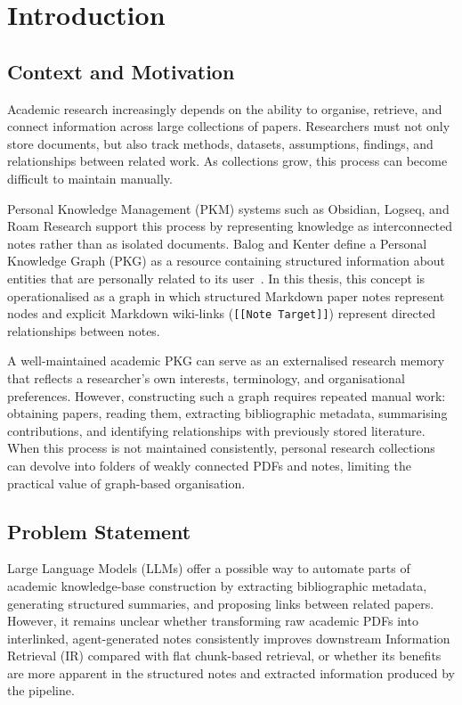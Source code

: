 \documentclass[runningheads]{llncs}
\begin{document}
\section{Introduction}
\label{sec:intro}

\subsection{Context and Motivation}

Academic research increasingly depends on the ability to organise,
retrieve, and connect information across large collections of papers.
Researchers must not only store documents, but also track methods,
datasets, assumptions, findings, and relationships between related work.
As collections grow, this process can become difficult to maintain
manually.

Personal Knowledge Management (PKM) systems such as Obsidian, Logseq,
and Roam Research support this process by representing knowledge as
interconnected notes rather than as isolated documents. Balog and Kenter
define a Personal Knowledge Graph (PKG) as a resource containing
structured information about entities that are personally related to its
user~\cite{balog2019personal}. In this thesis, this concept is
operationalised as a graph in which structured Markdown paper notes
represent nodes and explicit Markdown wiki-links
(\texttt{[[Note Target]]}) represent directed relationships between
notes.

A well-maintained academic PKG can serve as an externalised research
memory that reflects a researcher's own interests, terminology, and
organisational preferences. However, constructing such a graph requires
repeated manual work: obtaining papers, reading them, extracting
bibliographic metadata, summarising contributions, and identifying
relationships with previously stored literature. When this process is
not maintained consistently, personal research collections can devolve
into folders of weakly connected PDFs and notes, limiting the practical
value of graph-based organisation.

\subsection{Problem Statement}

Large Language Models (LLMs) offer a possible way to automate parts of
academic knowledge-base construction by extracting bibliographic
metadata, generating structured summaries, and proposing links between
related papers. However, it remains unclear whether transforming raw
academic PDFs into interlinked, agent-generated notes consistently
improves downstream Information Retrieval (IR) compared with flat
chunk-based retrieval, or whether its benefits are more apparent in the
structured notes and extracted information produced by the pipeline.
\end{document}
